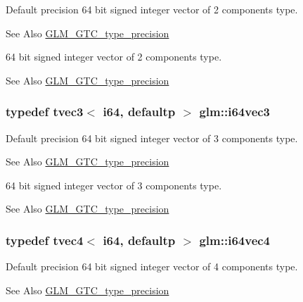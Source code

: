 Default precision 64 bit signed integer vector of 2 components type. \begin{DoxySeeAlso}{See Also}
\hyperlink{group__gtc__type__precision}{G\-L\-M\-\_\-\-G\-T\-C\-\_\-type\-\_\-precision}
\end{DoxySeeAlso}
64 bit signed integer vector of 2 components type. \begin{DoxySeeAlso}{See Also}
\hyperlink{group__gtc__type__precision}{G\-L\-M\-\_\-\-G\-T\-C\-\_\-type\-\_\-precision} 
\end{DoxySeeAlso}
\hypertarget{group__gtc__type__precision_ga189eb8d6a197bc491cabb6e1f120ecf4}{
\subsubsection[{i64vec3}]{\setlength{\rightskip}{0pt plus 5cm}typedef tvec3$<$ i64, defaultp $>$ {\bf glm\-::i64vec3}}}\label{group__gtc__type__precision_ga189eb8d6a197bc491cabb6e1f120ecf4}
Default precision 64 bit signed integer vector of 3 components type. \begin{DoxySeeAlso}{See Also}
\hyperlink{group__gtc__type__precision}{G\-L\-M\-\_\-\-G\-T\-C\-\_\-type\-\_\-precision}
\end{DoxySeeAlso}
64 bit signed integer vector of 3 components type. \begin{DoxySeeAlso}{See Also}
\hyperlink{group__gtc__type__precision}{G\-L\-M\-\_\-\-G\-T\-C\-\_\-type\-\_\-precision} 
\end{DoxySeeAlso}
\hypertarget{group__gtc__type__precision_gade5e969a6155752095d2cd603bda9408}{
\subsubsection[{i64vec4}]{\setlength{\rightskip}{0pt plus 5cm}typedef tvec4$<$ i64, defaultp $>$ {\bf glm\-::i64vec4}}}\label{group__gtc__type__precision_gade5e969a6155752095d2cd603bda9408}
Default precision 64 bit signed integer vector of 4 components type. \begin{DoxySeeAlso}{See Also}
\hyperlink{group__gtc__type__precision}{G\-L\-M\-\_\-\-G\-T\-C\-\_\-type\-\_\-precision}
\end{DoxySeeAlso}
